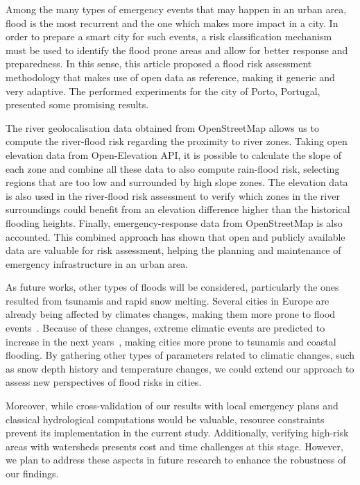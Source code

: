 \begin{refsection}
Among the many types of emergency events that may happen in an urban area, flood is the most recurrent and the one which makes more impact in a city. In order to prepare a smart city for such events, a risk classification mechanism must be used to identify the flood prone areas and allow for better response and preparedness. In this sense, this article proposed a flood risk assessment methodology that makes use of open data as reference, making it generic and very adaptive. The performed experiments for the city of Porto, Portugal, presented some promising results.

The river geolocalisation data obtained from OpenStreetMap allows us to compute the river-flood risk regarding the proximity to river zones. Taking open elevation data from Open-Elevation API, it is possible to calculate the slope of each zone and combine all these data to also compute rain-flood risk, selecting regions that are too low and surrounded by high slope zones. The elevation data is also used in the river-flood risk assessment to verify which zones in the river surroundings could benefit from an elevation difference higher than the historical flooding heights. Finally, emergency-response data from OpenStreetMap is also accounted. This combined approach has shown that open and publicly available data are valuable for risk assessment, helping the planning and maintenance of emergency infrastructure in an urban area.

As future works, other types of floods will be considered, particularly the ones resulted from tsunamis and rapid snow melting. Several cities in Europe are already being affected by climates changes, making them more prone to flood events~\cite{warming}. Because of these changes, extreme climatic events are predicted to increase in the next years~\cite{warming2}, making cities more prone to tsunamis and coastal flooding. By gathering other types of parameters related to climatic changes, such as snow depth history and temperature changes, we could extend our approach to assess new perspectives of flood risks in cities. 

Moreover, while cross-validation of our results with local emergency plans and classical hydrological computations would be valuable, resource constraints prevent its implementation in the current study. Additionally, verifying high-risk areas with watersheds presents cost and time challenges at this stage. However, we plan to address these aspects in future research to enhance the robustness of our findings.

\printbibliography[heading=subbibliography]

\end{refsection}
